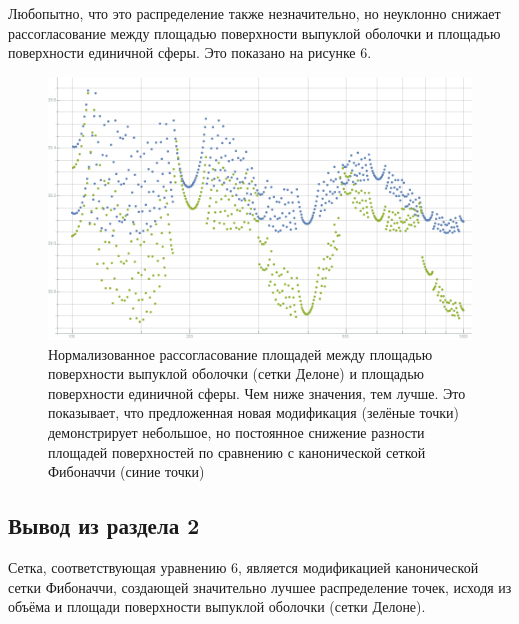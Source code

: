 \documentclass[12pt, a4paper]{article}
\begin{document}
Любопытно, что это распределение также незначительно, но неуклонно снижает рассогласование между площадью поверхности выпуклой оболочки и площадью поверхности единичной сферы. Это показано на рисунке 6.

\begin{figure}[H]
    \centering
    \includegraphics[width=\textwidth]{images/7.png}
    \caption{Нормализованное рассогласование площадей между площадью поверхности выпуклой оболочки (сетки Делоне) и площадью поверхности единичной сферы. Чем ниже значения, тем лучше. Это показывает, что предложенная новая модификация (зелёные точки) демонстрирует небольшое, но постоянное снижение разности площадей поверхностей по сравнению с канонической сеткой Фибоначчи (синие точки)}
\end{figure}

\subsection{Вывод из раздела 2}

Сетка, соответствующая уравнению 6, является модификацией канонической сетки Фибоначчи, создающей значительно лучшее распределение точек, исходя из объёма и площади поверхности выпуклой оболочки (сетки Делоне).

\newpage

\section*{}

\nocite{*}  %
\end{document}
